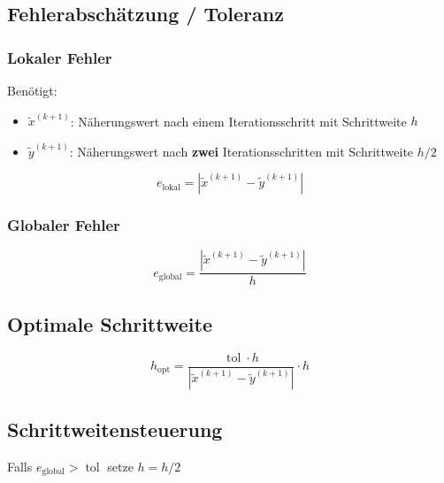 \documentclass[a4paper, twoside]{article}
\begin{document}
\subsection{Fehlerabschätzung / Toleranz}

\subsubsection{Lokaler Fehler}

Benötigt:

\begin{itemize}
\item \(\tilde{x}^{(k+1)}\): Näherungswert nach einem Iterationsschritt mit Schrittweite \(h\)
\item \(\tilde{y}^{(k+1)}\): Näherungswert nach \textbf{zwei} Iterationsschritten mit Schrittweite \(h/2\)
\end{itemize}

\[e_{\text{lokal}} = |\tilde{x}^{(k+1)} - \tilde{y}^{(k+1)}|\]

\subsubsection{Globaler Fehler}

\[e_{\text{global}} = \frac{|\tilde{x}^{(k+1)} - \tilde{y}^{(k+1)}|}{h}\]

\subsection{Optimale Schrittweite}

\[h_{\text{opt}} = \frac{\operatorname{tol} \cdot h}{|\tilde{x}^{(k+1)} - \tilde{y}^{(k+1)}|} \cdot h\]

\subsection{Schrittweitensteuerung}

Falls \(e_{\text{global}} > \operatorname{tol}\) setze \(h = h/2\)
\end{document}
